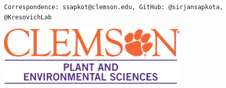 \documentclass[a0,portrait]{a0poster}
\begin{document}
\begin{minipage}[c]{\linewidth}
{\begin{minipage}[c]{0.70\textwidth}
\small \texttt{Correspondence: ssapkot@clemson.edu, GitHub: @sirjansapkota, @KresovichLab}\\
\end{minipage}
\begin{minipage}[c]{0.15\textwidth}
\vspace{0pt}\raggedleft
\includegraphics[scale=1,width=\linewidth]{pes-logo.png}
\hspace{1cm}
\end{minipage}}
\\[0.1cm]%
\color{Purple}\setlength\FrameRule{5pt}
\begin{framed}
\vspace{0.5cm}
\begin{multicols}{2} %
\color{Black}

\end{multicols}
\end{framed}
\end{minipage}
\end{document}
